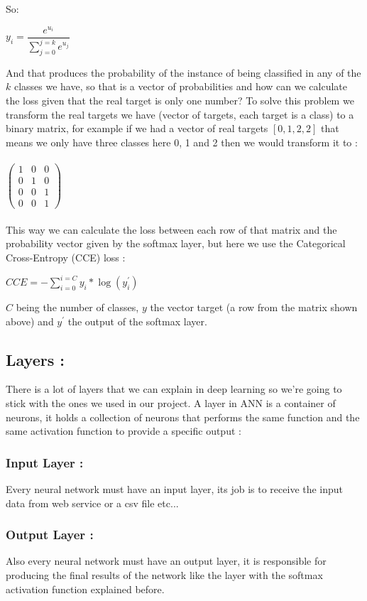 \documentclass[10pt,a4paper]{article}
\begin{document}
So:
\begin{center}
$ y_i = \dfrac{e^{u_i}}{\sum_{j=0}^{j=k}e^{u_j}} $
\end{center}
And that produces the probability of the instance of being classified in any of the $ k $ classes we have, so that is a vector of probabilities and how can we calculate the loss given that the real target is only one number? To solve this problem we transform the real targets we have (vector of targets, each target is a class) to a binary matrix, for example if we had a vector of real targets $ [0,1,2,2] $ that means we only have three classes here 0, 1 and 2 then we would transform it to :\\\\
$\begin{pmatrix}
1 & 0 & 0\\
0 & 1 & 0\\
0 & 0 & 1\\
0 & 0 & 1
\end{pmatrix}$\\\\
This way we can calculate the loss between each row of that matrix and the probability vector given by the softmax layer, but here we use the Categorical Cross-Entropy (CCE) loss :\\
\begin{center}
$ CCE = -\sum_{i=0}^{i=C}y_i*\log(y^{\prime}_i) $
\end{center}
\begin{center}
$ C $ being the number of classes, $ y $ the vector target (a row from the matrix shown above) and $ y^{\prime} $ the output of the softmax layer.
\end{center}
\subsection{Layers :}
There is a lot of layers that we can explain in deep learning so we're going to stick with the ones we used in our project. A layer in ANN is a container of neurons, it holds a collection of neurons that performs the same function and the same activation function to provide a specific output :
\subsubsection{Input Layer :}
Every neural network must have an input layer, its job is to receive the input data from web service or a csv file etc...
\subsubsection{Output Layer :}
Also every neural network must have an output layer, it is responsible for producing the final results of the network like the layer with the softmax activation function explained before.
\end{document}
